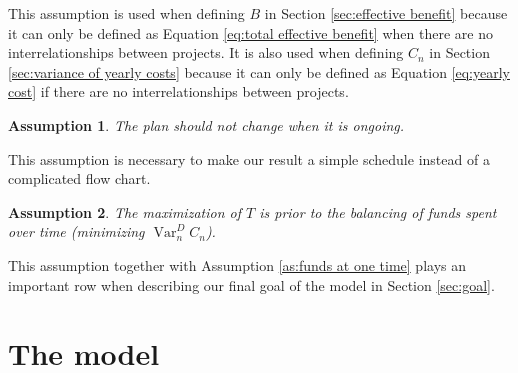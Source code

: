 \documentclass{article}
\DeclareMathOperator*{\var}{Var}
\newtheorem{assumption}{Assumption}
\begin{document}
This assumption is used when defining $B$ in Section \ref{sec:effective benefit} because it can only be defined as Equation \ref{eq:total effective benefit} when there are no interrelationships between projects.
It is also used when defining $C_n$ in Section \ref{sec:variance of yearly costs} because it can only be defined as Equation \ref{eq:yearly cost} if there are no interrelationships between projects.

\begin{assumption}
The plan should not change when it is ongoing.
\end{assumption}

This assumption is necessary to make our result a simple schedule instead of a complicated flow chart.

\begin{assumption}
\label{as:time efficiency over balancing}
The maximization of $T$ is prior to the balancing of funds spent over time (minimizing $\var_n^DC_n$).
\end{assumption}

This assumption together with Assumption \ref{as:funds at one time} plays an important row when describing our final goal of the model in Section \ref{sec:goal}.

\section{The model}
\label{sec:model}
\end{document}
